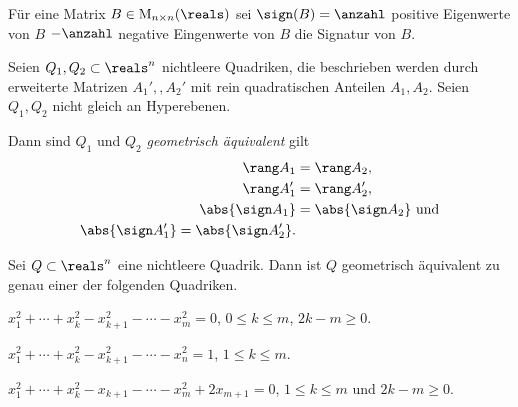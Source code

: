 Für eine Matrix \( B\in \Mat_{n\times n}(\reals) \) sei \( \sign(B)=\anzahl \) positive Eigenwerte von \( B \) \( -\anzahl \) negative Eingenwerte von \( B \) die Signatur von \( B \).
\begin{satz}
  Seien \( Q_1,Q_2\subset \reals^n \) nichtleere Quadriken, die beschrieben werden durch erweiterte Matrizen \( A_1',,A_2' \) mit rein quadratischen Anteilen \( A_1,A_2 \). Seien \( Q_1,Q_2 \) nicht gleich an Hyperebenen.

  Dann sind \( Q_1 \) und \( Q_2 \) \emph{geometrisch äquivalent} \gdw gilt
\begin{align*}
  \rang A_1&=\rang A_2,\\
  \rang A_1'&=\rang A_2',\\
  \abs{\sign A_1}&=\abs{\sign A_2}\text{ und}\\
  \abs{\sign A_1'}=\abs{\sign A_2'}.
\end{align*}
\end{satz}
\begin{folgerung}
  Sei \( Q\subset \reals^n \) eine nichtleere Quadrik. Dann ist \( Q \) geometrisch äquivalent zu genau einer der folgenden Quadriken.
  \begin{eigenschaftenenumerate}
    \item \label{quadriken_gleich_null_nur_quadrate}\( x_1^2+\dotsb+x_k^2-x_{k+1}^2-\dotsb-x_m^2=0 \), \( 0\leq k\leq m \), \( 2k-m\geq 0 \).
    \item \label{quadriken_gleich_eins}\( x_1^2+\dotsb+x_k^2-x_{k+1}^2-\dotsb-x_n^2=1 \), \( 1\leq k\leq m \).
    \item \label{qadriken_gleich_null_plus_ein_linearer}\( x_1^2+\dotsb+x_k^2-x_{k+1}-\dotsb-x_m^2+2x_{m+1}=0 \), \( 1\leq k\leq m \) und \( 2k-m\geq 0 \).
  \end{eigenschaftenenumerate}
\end{folgerung}
